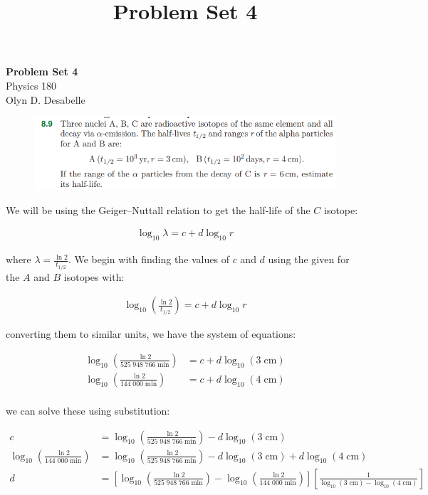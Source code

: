\documentclass[11pt]{article}
\theoremstyle{definition}
\begin{document}
\setcounter{section}{2}
\title{Problem Set 4}


\begin{center}
{\LARGE \bf Problem Set 4}\\
{\large Physics 180}\\
Olyn D. Desabelle
\end{center}

\begin{figure}[h!]
    \centering
    \includegraphics[scale = 0.5]{8.9.png}
\end{figure}

We will be using the Geiger–Nuttall relation to get the half-life of the $C$ isotope:

\begin{align}
    \log_{10} \lambda = c + d \log_{10} r 
\end{align}

where $\lambda = \frac{\ln 2}{t_{1/2}}$. We begin with finding the values of $c$ and $d$ using the given for the $A$ and $B$ isotopes with:

\begin{align}
        \log_{10} \left(\frac{\ln 2}{t_{1/2}} \right) = c + d \log_{10} r 
\end{align}

converting them to similar units, we have the system of equations:

\begin{align}
    \log_{10} \left(\frac{\ln 2}{525 \; 948\; 766\; \text{min}} \right) &= c + d \log_{10}(3\; \text{cm}) \\
    \log_{10} \left(\frac{\ln 2}{144\; 000\; \text{min}} \right) &= c + d \log_{10}(4\; \text{cm})\\
\end{align}

we can solve these using substitution:

\begin{align}
    c &=  \log_{10} \left(\frac{\ln 2}{525 \; 948\; 766\; \text{min}} \right) -  d \log_{10}(3\; \text{cm})\\
    \log_{10} \left(\frac{\ln 2}{144\; 000\; \text{min}} \right) &= \log_{10} \left(\frac{\ln 2}{525 \; 948\; 766\; \text{min}} \right) -  d \log_{10}(3\; \text{cm}) + d \log_{10}(4\; \text{cm})\\
    d &=  \left[\log_{10}\left(\frac{\ln 2}{525 \; 948\; 766\; \text{min}} \right) - \log_{10} \left(\frac{\ln 2}{144\; 000\; \text{min}} \right)\right] \left[\frac{1}{\log_{10}(3\; \text{cm}) - \log_{10}(4\; \text{cm})}\right]
\end{align}
\end{document}
